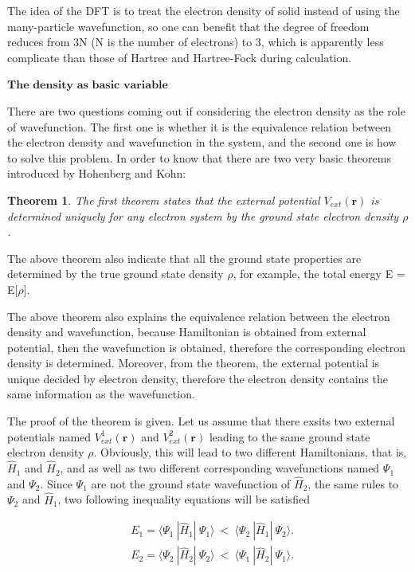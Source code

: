 \documentclass[a4paper, 12pt, titlepage,oneside,drop]{kthesis}
\newtheorem{thm}{Theorem}
\begin{document}
The idea of the DFT is to treat the electron density of solid instead of using the many-particle wavefunction, so one can
 benefit that the degree of freedom reduces from 3N (N is the number of electrons) to 3, which is apparently less complicate than 
those of Hartree and Hartree-Fock during calculation. 

$\textbf{The density as basic variable}$ 

There are two questions coming out if considering the electron density as the role of wavefunction. The first one is whether it
 is the equivalence relation between the electron density and wavefunction in the system, and the second one is how to solve this 
problem. In order to know that there are two very basic theorems introduced by Hohenberg and Kohn:

\begin{thm}
\label{hk1}
\noindent The first theorem states that the external potential $V_\textit{ext}(\textbf{r})$  is determined uniquely for any electron system by the ground state electron density $\rho$.
\end{thm}

The above theorem also indicate that all the ground state properties are determined by the true ground state density $\rho$,
for example, the total energy E = E[$\rho$]. 

The above theorem also explains the equivalence relation between the electron density and wavefunction, because Hamiltonian is obtained from external potential,
then the wavefunction is obtained, therefore the corresponding electron density is determined. Moreover, from the theorem, the external potential is unique decided by electron
density, therefore the electron density contains the same information as the wavefunction.

The proof of the theorem is given. Let us assume that there exsits two external potentials named $V^{1}_\textit{ext}(\textbf{r})$ and $V^{2}_\textit{ext}(\textbf{r})$ leading to the same ground state 
electron density $\rho$. Obviously, this will lead to two different Hamiltonians, that is, $\hat{H}_{1}$ and $\hat{H}_{2}$, and as well as two different corresponding
wavefunctions named $\Psi_1$ and $\Psi_2$. Since $\Psi_1$ are not the ground state wavefunction of $\hat{H}_{2}$, the same rules to $\Psi_2$ and $\hat{H}_{1}$, two following
inequality equations will be satisfied

\begin{equation}\label{hkpf1}\begin{split}
&  E_1 = \langle \Psi_1\ |\hat{H}_{1}|\ \Psi_1 \rangle  \ < \  \langle \Psi_2\ |\hat{H}_{1}|\ \Psi_2 \rangle.\\
&  E_2 = \langle \Psi_2\ |\hat{H}_{2}|\ \Psi_2 \rangle  \ < \  \langle \Psi_1\ |\hat{H}_{2}|\ \Psi_1 \rangle.
\end{split}\end{equation}
\end{document}
